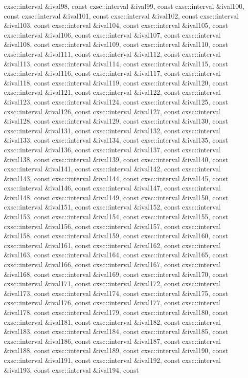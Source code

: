\begin{DoxyCompactItemize}
cxsc\-::interval \&ival98, const cxsc\-::interval \&ival99, const cxsc\-::interval \&ival100, const cxsc\-::interval \&ival101, const cxsc\-::interval \&ival102, const cxsc\-::interval \&ival103, const cxsc\-::interval \&ival104, const cxsc\-::interval \&ival105, const cxsc\-::interval \&ival106, const cxsc\-::interval \&ival107, const cxsc\-::interval \&ival108, const cxsc\-::interval \&ival109, const cxsc\-::interval \&ival110, const cxsc\-::interval \&ival111, const cxsc\-::interval \&ival112, const cxsc\-::interval \&ival113, const cxsc\-::interval \&ival114, const cxsc\-::interval \&ival115, const cxsc\-::interval \&ival116, const cxsc\-::interval \&ival117, const cxsc\-::interval \&ival118, const cxsc\-::interval \&ival119, const cxsc\-::interval \&ival120, const cxsc\-::interval \&ival121, const cxsc\-::interval \&ival122, const cxsc\-::interval \&ival123, const cxsc\-::interval \&ival124, const cxsc\-::interval \&ival125, const cxsc\-::interval \&ival126, const cxsc\-::interval \&ival127, const cxsc\-::interval \&ival128, const cxsc\-::interval \&ival129, const cxsc\-::interval \&ival130, const cxsc\-::interval \&ival131, const cxsc\-::interval \&ival132, const cxsc\-::interval \&ival133, const cxsc\-::interval \&ival134, const cxsc\-::interval \&ival135, const cxsc\-::interval \&ival136, const cxsc\-::interval \&ival137, const cxsc\-::interval \&ival138, const cxsc\-::interval \&ival139, const cxsc\-::interval \&ival140, const cxsc\-::interval \&ival141, const cxsc\-::interval \&ival142, const cxsc\-::interval \&ival143, const cxsc\-::interval \&ival144, const cxsc\-::interval \&ival145, const cxsc\-::interval \&ival146, const cxsc\-::interval \&ival147, const cxsc\-::interval \&ival148, const cxsc\-::interval \&ival149, const cxsc\-::interval \&ival150, const cxsc\-::interval \&ival151, const cxsc\-::interval \&ival152, const cxsc\-::interval \&ival153, const cxsc\-::interval \&ival154, const cxsc\-::interval \&ival155, const cxsc\-::interval \&ival156, const cxsc\-::interval \&ival157, const cxsc\-::interval \&ival158, const cxsc\-::interval \&ival159, const cxsc\-::interval \&ival160, const cxsc\-::interval \&ival161, const cxsc\-::interval \&ival162, const cxsc\-::interval \&ival163, const cxsc\-::interval \&ival164, const cxsc\-::interval \&ival165, const cxsc\-::interval \&ival166, const cxsc\-::interval \&ival167, const cxsc\-::interval \&ival168, const cxsc\-::interval \&ival169, const cxsc\-::interval \&ival170, const cxsc\-::interval \&ival171, const cxsc\-::interval \&ival172, const cxsc\-::interval \&ival173, const cxsc\-::interval \&ival174, const cxsc\-::interval \&ival175, const cxsc\-::interval \&ival176, const cxsc\-::interval \&ival177, const cxsc\-::interval \&ival178, const cxsc\-::interval \&ival179, const cxsc\-::interval \&ival180, const cxsc\-::interval \&ival181, const cxsc\-::interval \&ival182, const cxsc\-::interval \&ival183, const cxsc\-::interval \&ival184, const cxsc\-::interval \&ival185, const cxsc\-::interval \&ival186, const cxsc\-::interval \&ival187, const cxsc\-::interval \&ival188, const cxsc\-::interval \&ival189, const cxsc\-::interval \&ival190, const cxsc\-::interval \&ival191, const cxsc\-::interval \&ival192, const cxsc\-::interval \&ival193, const cxsc\-::interval \&ival194, const 
\end{DoxyCompactItemize}
